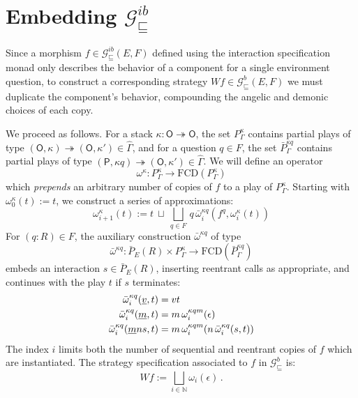 \documentclass[11pt,oneside]{book}
\theoremstyle{definition}
\newcommand{\gcat}{\mathcal{G}_{\sqsubseteq}}
\newcommand{\kw}[1]{\ensuremath{ \mathsf{#1} }}
\newcommand{\ul}[1]{%
  \underline{\smash{#1}}
}
\begin{document}

\section{Embedding $\gcat^{ib}$} \label{sec:gamesem:emb} %

Since a morphism $f \in \gcat^{ib}(E,F)$
defined using the interaction specification monad
only describes the behavior of a component
for a single environment question,
to construct a corresponding strategy $W f \in \gcat^b(E,F)$
we must duplicate the component's behavior,
compounding the angelic and demonic choices of each copy.

We proceed as follows.
For a stack
$\kappa : \kw{O} \twoheadrightarrow \kw{O}$,
the set $P^\kappa_\Gamma$ contains
partial plays of type
$(\kw{O}, \kappa) \twoheadrightarrow (\kw{O}, \kappa')
 \in \hat{\Gamma}$,
and for a question $q \in F$,
the set $\bar{P}^{\kappa q}_\Gamma$ contains
partial plays of type
$(\kw{P}, \kappa q) \twoheadrightarrow (\kw{O}, \kappa')
 \in \hat{\Gamma}$.
We will define an operator
\[
  \omega^\kappa :
    P^\kappa_\Gamma \rightarrow
    \mathrm{FCD}(P^\kappa_\Gamma)
\]
which \emph{prepends} an arbitrary number of copies of $f$
to a play of $P^\kappa_\Gamma$.
Starting with
$\omega^\kappa_0(t) := t$,
we construct a series of approximations:
\[
  \omega^\kappa_{i+1}(t) :=
    t \: \sqcup \:
    \bigsqcup_{q \in F} \,
      q \, \bar{\omega}^{\kappa q}_i(f^q, \omega^\kappa_i(t))
\]
For $(q \mathbin: R) \in F$,
the auxiliary construction $\bar{\omega}^{\kappa q}$ of type
\[
  \bar{\omega}^{\kappa q} :
    \bar{P}_E(R) \times P^{\kappa}_\Gamma \rightarrow
    \mathrm{FCD}(\bar{P}^{\kappa q}_\Gamma)
\]
embeds an interaction $s \in \bar{P}_E(R)$,
inserting reentrant calls as appropriate,
and continues with the play $t$
if $s$ terminates:
\begin{align*}
  \bar{\omega}^{\kappa q}_i(\ul v, t) &=
    v t
  \\
  \bar{\omega}^{\kappa q}_i(\ul m, t) &=
    m \, \omega^{\kappa q m}_i(\epsilon)
  \\
  \bar{\omega}^{\kappa q}_i(\ul m n s, t) &=
    m \, \omega^{\kappa q m}_i(n \, \bar{\omega}^{\kappa q}_i(s, t))
\end{align*}
The index $i$ limits both the number of
sequential and reentrant copies of $f$
which are instantiated.
The strategy specification associated to $f$
in $\gcat^{b}$ is:
\[
    W f := \bigsqcup_{i \in \mathbb{N}} \omega_i(\epsilon) \,.
\]

\end{document}
